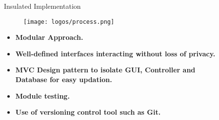 \documentclass[final]{beamer}
\newlength{\sepwid}
\newlength{\onecolwid}
\newlength{\twocolwid}
\begin{document}
\begin{frame}[t]
\begin{columns}[t]
\begin{column}{\twocolwid}
\begin{columns}[t,totalwidth=\twocolwid]
\begin{column}{\onecolwid}
\begin{block}{Insulated Implementation}
    \begin{figure}[h!]
  \centering
   \texttt{[image: logos/process.png]}
\end{figure}
\begin{alertblock}{ }
\begin{itemize}
    \item \textbf{Modular Approach.}
    \item \textbf{Well-defined interfaces interacting without loss of privacy.}
    \item \textbf{MVC Design pattern to isolate GUI, Controller and Database for easy updation.}
    \item \textbf{Module testing.}
    \item \textbf{Use of versioning control tool such as Git.}
\end{itemize}
\end{alertblock}
\end{block}


\end{column} %

\end{columns} %




\begin{columns}[t,totalwidth=\twocolwid] %




\end{columns} %

\end{column} %

\begin{column}{\sepwid}\end{column} %

\begin{column}{\onecolwid} %


\end{column}
\end{columns}
\end{frame}
\end{document}
